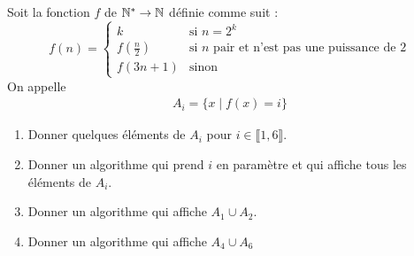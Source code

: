 \documentclass[french,a4paper,10pt]{article}
\begin{document}
	\begin{td-exo}[]
		Soit la fonction $f$ de $\mathbb{N}^\ast\to\mathbb{N}$ définie comme suit :
			\[
			f(n)=
				\begin{cases}
					k&\text{si }n=2^k\\
					f(\frac n2)&\text{si }n\text{ pair et n'est pas une puissance de }2\\
						f(3n+1)&\text{sinon}
				\end{cases}
			\]
		On appelle
			\[\begin{aligned}
				A_i=\{x\mid f(x)=i\}
			\end{aligned}\]
		\begin{enumerate}
			\item Donner quelques éléments de $A_i$ pour $i\in\llbracket1,6\rrbracket$.
			
			\item Donner un algorithme qui prend $i$ en paramètre et qui affiche tous les éléments de $A_i$.
			
			\item Donner un algorithme qui affiche $A_1\cup A_2$.
			
			\item Donner un algorithme qui affiche $A_4\cup A_6$
		\end{enumerate}
		
	\end{td-exo}
	
\end{document}
